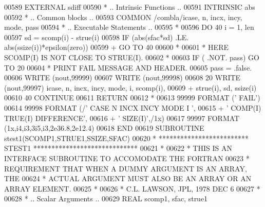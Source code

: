 \begin{DoxyCode}
00589       \textcolor{keywordtype}{EXTERNAL}         sdiff
00590 \textcolor{comment}{*     .. Intrinsic Functions ..}
00591       \textcolor{keywordtype}{INTRINSIC}        abs
00592 \textcolor{comment}{*     .. Common blocks ..}
00593       \textcolor{keyword}{COMMON}           /combla/icase, n, incx, incy, mode, pass
00594 \textcolor{comment}{*     .. Executable Statements ..}
00595 \textcolor{comment}{*}
00596       \textcolor{keywordflow}{DO} 40 i = 1, len
00597          sd = scomp(i) - strue(i)
00598          \textcolor{keywordflow}{IF} (abs(sfac*sd) .LE. abs(ssize(i))*epsilon(zero))
00599      +       \textcolor{keywordflow}{GO TO} 40
00600 \textcolor{comment}{*}
00601 \textcolor{comment}{*                             HERE    SCOMP(I) IS NOT CLOSE TO STRUE(I).}
00602 \textcolor{comment}{*}
00603          \textcolor{keywordflow}{IF} ( .NOT. pass) \textcolor{keywordflow}{GO TO} 20
00604 \textcolor{comment}{*                             PRINT FAIL MESSAGE AND HEADER.}
00605          pass = .false.
00606          \textcolor{keyword}{WRITE} (nout,99999)
00607          \textcolor{keyword}{WRITE} (nout,99998)
00608    20    \textcolor{keyword}{WRITE} (nout,99997) icase, n, incx, incy, mode, i, scomp(i),
00609      +     strue(i), sd, ssize(i)
00610    40 \textcolor{keywordflow}{CONTINUE}
00611       \textcolor{keywordflow}{RETURN}
00612 \textcolor{comment}{*}
00613 99999 \textcolor{keyword}{FORMAT} (\textcolor{stringliteral}{'                                       FAIL'})
00614 99998 \textcolor{keyword}{FORMAT} (/\textcolor{stringliteral}{' CASE  N INCX INCY MODE  I                            '},
00615      +       \textcolor{stringliteral}{' COMP(I)                             TRUE(I)  DIFFERENCE'},
00616      +       \textcolor{stringliteral}{'     SIZE(I)'},/1x)
00617 99997 \textcolor{keyword}{FORMAT} (1x,i4,i3,3i5,i3,2e36.8,2e12.4)
00618 \textcolor{keyword}{      END}
00619 \textcolor{keyword}{      SUBROUTINE }stest1(SCOMP1,STRUE1,SSIZE,SFAC)
00620 \textcolor{comment}{*     ************************* STEST1 *****************************}
00621 \textcolor{comment}{*}
00622 \textcolor{comment}{*     THIS IS AN INTERFACE SUBROUTINE TO ACCOMODATE THE FORTRAN}
00623 \textcolor{comment}{*     REQUIREMENT THAT WHEN A DUMMY ARGUMENT IS AN ARRAY, THE}
00624 \textcolor{comment}{*     ACTUAL ARGUMENT MUST ALSO BE AN ARRAY OR AN ARRAY ELEMENT.}
00625 \textcolor{comment}{*}
00626 \textcolor{comment}{*     C.L. LAWSON, JPL, 1978 DEC 6}
00627 \textcolor{comment}{*}
00628 \textcolor{comment}{*     .. Scalar Arguments ..}
00629       \textcolor{keywordtype}{REAL}              scomp1, sfac, strue1

\end{DoxyCode}
